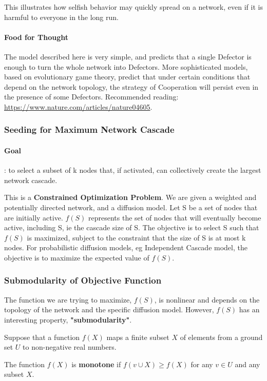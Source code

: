 \documentclass[11pt]{scrartcl} %
\begin{document}
This illustrates how selfish behavior may quickly spread on a network, even if it is harmful to everyone in the long run.

\paragraph{Food for Thought}
The model described here is very simple, and predicts that a single Defector is enough to turn the whole network into Defectors. More sophisticated models, based on evolutionary game theory, predict that under certain conditions that depend on the network topology, the strategy of Cooperation will persist even in the presence of some Defectors. Recommended reading: \url{https://www.nature.com/articles/nature04605}.

\subsubsection{Seeding for Maximum Network Cascade}
\paragraph{Goal}: to select a subset of k nodes that, if activated, can collectively create the largest network cascade.

This is a \textbf{Constrained Optimization Problem}. We are given a weighted and potentially directed network, and a diffusion model. Let S be a set of nodes that are initially active. $f(S)$ represents the set of nodes that will eventually become active, including S, ie the cascade size of S. The objective is to select S such that $f(S)$ is maximized, subject to the constraint that the size of S is at most k nodes. For probabilistic diffusion models, eg Independent Cascade model, the objective is to maximize the expected value of $f(S)$.

\subsubsection{Submodularity of Objective Function}
The function we are trying to maximize, $f(S)$, is nonlinear and depends on the topology of the network and the specific diffusion model. However, $f(S)$ has an interesting property, \textbf{"submodularity"}.

Suppose that a function $f(X)$ maps a finite subset $X$ of elements from a ground set $U$ to non-negative real numbers.

The function $f(X)$ is \textbf{monotone} if $f(v \cup X) \geq f(X)$ for any $v \in U$ and any subset $X$.
\end{document}
